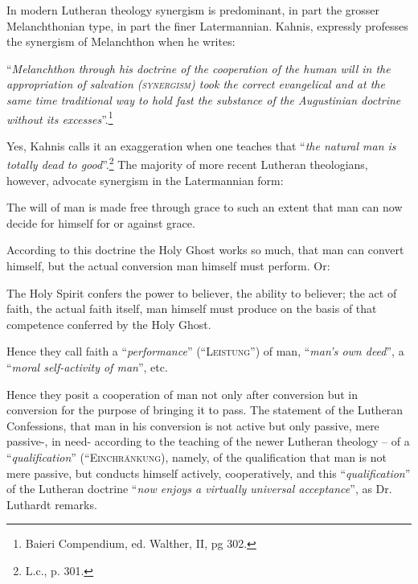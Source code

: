                 In modern Lutheran theology synergism is predominant, in part the grosser Melanchthonian type, in part the finer Latermannian.  Kahnis,  expressly professes the synergism of Melanchthon when he writes: \begin{displayquote}“\textit{Melanchthon through his doctrine of the cooperation of the human will in the appropriation of salvation {\scriptsize\textsc{(synergism)}} took the correct evangelical and at the same time traditional way to hold fast the substance of the Augustinian doctrine without its excesses}”.\footnote{Baieri Compendium, ed. Walther, II, pg 302.}\end{displayquote} Yes, Kahnis calls it an exaggeration when one teaches that “\textit{the natural man is totally dead to good}”.\footnote{L.c., p. 301.}  The majority of more recent Lutheran theologians, however, advocate synergism in the Latermannian form: \begin{displayquote}{\footnotesize The will of man is made free through grace to such an extent that man can now decide for himself for or against grace.}\end{displayquote}  According to this doctrine the Holy Ghost works so much, that man can convert himself, but the actual conversion man himself must perform.  Or: \begin{displayquote}{\footnotesize The Holy Spirit confers the power to believer, the ability to believer; the act of faith, the actual faith itself, man himself must produce on the basis of that competence conferred by the Holy Ghost.}\end{displayquote}  Hence they call faith a “\textit{performance}” {\scriptsize\textsc{(“Leistung”)}} of man, “\textit{man’s own deed}”, a “\textit{moral self-activity of man}”, etc.  \par Hence they posit a cooperation of man not only after conversion but in conversion for the purpose of bringing it to pass.  The statement of the Lutheran Confessions, that man in his conversion is not active but only passive, mere passive-, in need- according to the teaching of the newer Lutheran theology – of a “\textit{qualification}” {\scriptsize\textsc{(“Einchränkung)}}, namely, of the qualification that man is not mere passive, but conducts himself actively, cooperatively, and this “\textit{qualification}” of the Lutheran doctrine “\textit{now enjoys a virtually universal acceptance}”, as Dr. Luthardt remarks.

